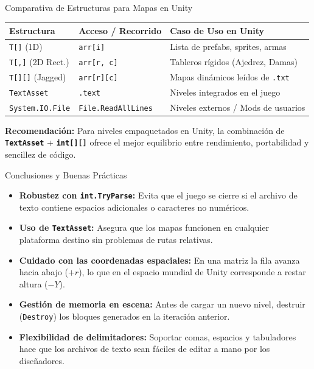 \documentclass{beamer}
\begin{document}
\begin{frame}{Comparativa de Estructuras para Mapas en Unity}
  \begin{table}
    \centering
    \small
    \begin{tabular}{|l|l|l|}
      \hline
      \textbf{Estructura} & \textbf{Acceso / Recorrido} & \textbf{Caso de Uso en Unity} \\ \hline
      \texttt{T[]} (1D) & \texttt{arr[i]} & Lista de prefabs, sprites, armas \\ \hline
      \texttt{T[,]} (2D Rect.) & \texttt{arr[r, c]} & Tableros r\'igidos (Ajedrez, Damas) \\ \hline
      \texttt{T[][]} (Jagged) & \texttt{arr[r][c]} & Mapas din\'amicos le\'idos de \texttt{.txt} \\ \hline
      \texttt{TextAsset} & \texttt{.text} & Niveles integrados en el juego \\ \hline
      \texttt{System.IO.File} & \texttt{File.ReadAllLines} & Niveles externos / Mods de usuarios \\ \hline
    \end{tabular}
  \end{table}

  \vspace{0.3cm}
  \textbf{Recomendaci\'on:} Para niveles empaquetados en Unity, la combinaci\'on de \textbf{\texttt{TextAsset}} + \textbf{\texttt{int[][]}} ofrece el mejor equilibrio entre rendimiento, portabilidad y sencillez de c\'odigo.
\end{frame}

\begin{frame}{Conclusiones y Buenas Pr\'acticas}
  \begin{itemize}
    \item \textbf{Robustez con \texttt{int.TryParse}:} Evita que el juego se cierre si el archivo de texto contiene espacios adicionales o caracteres no num\'ericos.
    \item \textbf{Uso de \texttt{TextAsset}:} Asegura que los mapas funcionen en cualquier plataforma destino sin problemas de rutas relativas.
    \item \textbf{Cuidado con las coordenadas espaciales:} En una matriz la fila avanza hacia abajo ($+r$), lo que en el espacio mundial de Unity corresponde a restar altura ($-Y$).
    \item \textbf{Gesti\'on de memoria en escena:} Antes de cargar un nuevo nivel, destruir (\texttt{Destroy}) los bloques generados en la iteraci\'on anterior.
    \item \textbf{Flexibilidad de delimitadores:} Soportar comas, espacios y tabuladores hace que los archivos de texto sean f\'aciles de editar a mano por los dise\~nadores.
  \end{itemize}
\end{frame}
\end{document}
